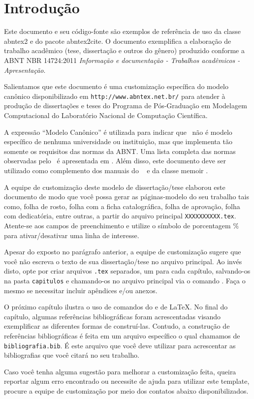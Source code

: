 \chapter[Introdução]{Introdução}\label{cap_intro}

Este documento e seu código-fonte são exemplos de referência de uso da classe
\textsf{abntex2} e do pacote \textsf{abntex2cite}. O documento
exemplifica a elaboração de trabalho acadêmico (tese, dissertação e outros do
gênero) produzido conforme a ABNT NBR 14724:2011 \emph{Informação e documentação
- Trabalhos acadêmicos - Apresentação}.

Salientamos que este documento é uma customização específica do modelo canônico
disponibilizado em \verb"http://www.abntex.net.br/" para atender à produção de
dissertações e teses do Programa de Pós-Graduação em Modelagem Computacional do
Laboratório Nacional de Computação Científica.

A expressão ``Modelo Canônico'' é utilizada para indicar que \abnTeX\ não é
modelo específico de nenhuma universidade ou instituição, mas que implementa tão
somente os requisitos das normas da ABNT. Uma lista completa das normas
observadas pelo \abnTeX\ é apresentada em . Além disso,
este documento deve ser utilizado como complemento dos manuais do \abnTeX\
\cite{abntex2classe,abntex2cite,abntex2cite-alf} e da classe \textsf{memoir}
\cite{memoir}.

A equipe de customização deste modelo de dissertação/tese elaborou este documento
de modo que você possa gerar as páginas-modelo do seu trabalho tais como, folha de
rosto, folha com a ficha catalográfica, folha de aprovação, folha com dedicatória,
entre outras, a partir do arquivo principal \verb"XXXXXXXXXX.tex". Atente-se aos
campos de preenchimento e utilize o símbolo de porcentagem $\%$ para ativar/desativar
uma linha de interesse.

Apesar do exposto no parágrafo anterior, a equipe de customização sugere que você não
escreva o texto de sua dissertação/tese no arquivo principal. Ao invés disto, opte por
criar arquivos \verb".tex" separados, um para cada capítulo, salvando-os na pasta
\verb"capitulos" e chamando-os no arquivo principal via o comando
\verb"". Faça o mesmo se necessitar incluir apêndices
e/ou anexos.

O próximo capítulo ilustra o uso de comandos do \abnTeX e de \LaTeX. No final do capítulo,
algumas referências bibliográficas foram acrescentadas visando exemplificar as diferentes
formas de construí-las. Contudo, a construção de referências bibliográficas é feita em um
arquivo específico o qual chamamos de \verb"bibliografia.bib". É este arquivo que você deve
utilizar para acrescentar as bibliografias que você citará no seu trabalho.

Caso você tenha alguma sugestão para melhorar a customização feita, queira reportar algum
erro encontrado ou necessite de ajuda para utilizar este template, procure a equipe de
customização por meio dos contatos abaixo disponibilizados.


